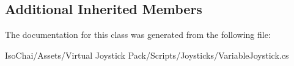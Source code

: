 \subsection*{Additional Inherited Members}


The documentation for this class was generated from the following file\+:\begin{DoxyCompactItemize}
\item 
Iso\+Chai/\+Assets/\+Virtual Joystick Pack/\+Scripts/\+Joysticks/Variable\+Joystick.\+cs\end{DoxyCompactItemize}
